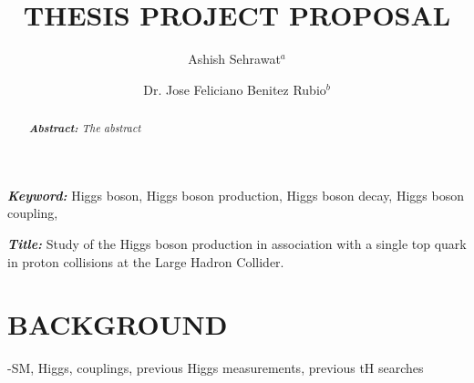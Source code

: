 \documentclass[final,3p]{CSP}
\begin{document}
\begin{frontmatter}

\title{THESIS PROJECT PROPOSAL}

\author[]{Ashish Sehrawat$^a$}
\author[]{Dr. Jose Feliciano Benitez Rubio$^b$}


\address[mymainaddress]{Universidad de Sonora}

\begin{keyword}\rm
\begin{adjustwidth}{2cm}{2cm}{\itshape\textbf{Keyword:}}  
Higgs boson, Higgs boson production, Higgs boson decay, Higgs boson coupling, 
\end{adjustwidth}
\end{keyword}


\begin{keyword}\rm
\begin{adjustwidth}{2cm}{2cm}{\itshape\textbf{Title:}}  
Study of the Higgs boson production in association with a single top quark in proton collisions at the Large Hadron Collider.
\end{adjustwidth}
\end{keyword}

\begin{abstract}\rm
\itshape\textbf{Abstract:}
The abstract
\end{abstract}


\end{frontmatter}

\section{BACKGROUND}

-SM, Higgs, couplings, previous Higgs measurements, previous tH searches\\
\end{document}
